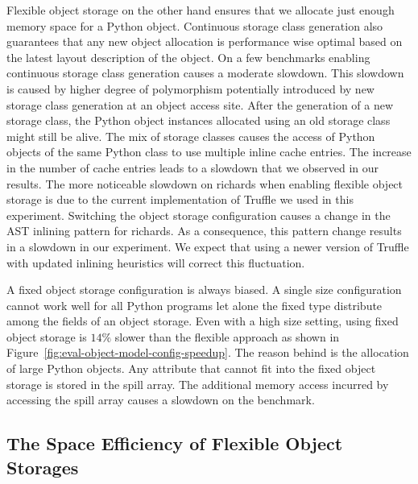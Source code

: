 Flexible object storage on the other hand ensures that we allocate just enough memory space for a Python object.
Continuous storage class generation also guarantees that any new object allocation is performance wise optimal based on the latest layout description of the object.
On a few benchmarks enabling continuous storage class generation causes a moderate slowdown.
This slowdown is caused by higher degree of polymorphism potentially introduced by new storage class generation at an object access site.
After the generation of a new storage class, the Python object instances allocated using an old storage class might still be alive.
The mix of storage classes causes the access of Python objects of the same Python class to use multiple inline cache entries.
The increase in the number of cache entries leads to a slowdown that we observed in our results.
The more noticeable slowdown on \textsf{richards} when enabling flexible object storage is due to the current implementation of Truffle we used in this experiment.
Switching the object storage configuration causes a change in the AST inlining pattern for \textsf{richards}.
As a consequence, this pattern change results in a slowdown in our experiment.
We expect that using a newer version of Truffle with updated inlining heuristics will correct this fluctuation.

A fixed object storage configuration is always biased.
A single size configuration cannot work well for all Python programs let alone the fixed type distribute among the fields of an object storage.
Even with a high size setting, using fixed object storage is $14\%$ slower than the flexible approach as shown in Figure~\ref{fig:eval-object-model-config-speedup}.
The reason behind is the allocation of large Python objects.
Any attribute that cannot fit into the fixed object storage is stored in the spill array.
The additional memory access incurred by accessing the spill array causes a slowdown on the benchmark.

\subsection{The Space Efficiency of Flexible Object Storages}

